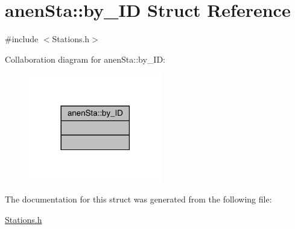 \hypertarget{structanen_sta_1_1by___i_d}{}\section{anen\+Sta\+:\+:by\+\_\+\+ID Struct Reference}
\label{structanen_sta_1_1by___i_d}


{\ttfamily \#include $<$Stations.\+h$>$}



Collaboration diagram for anen\+Sta\+:\+:by\+\_\+\+ID\+:\nopagebreak
\begin{figure}[H]
\begin{center}
\leavevmode
\includegraphics[width=165pt]{structanen_sta_1_1by___i_d__coll__graph}
\end{center}
\end{figure}


The documentation for this struct was generated from the following file\+:\begin{DoxyCompactItemize}
\item 
\mbox{\hyperlink{_stations_8h}{Stations.\+h}}\end{DoxyCompactItemize}

